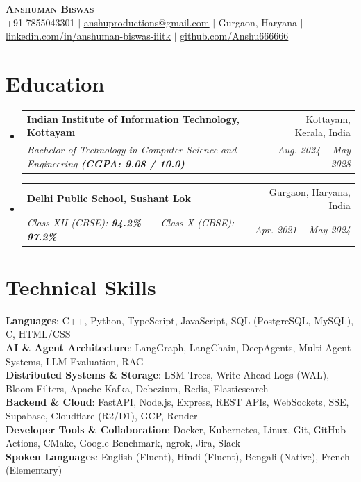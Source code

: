 \documentclass[letterpaper,10pt]{article}
\makeatletter
\newcommand{\resumeSubheading}[4]{
  \vspace{-3pt}\item
    \begin{tabular*}{0.98\textwidth}[t]{l@{\extracolsep{\fill}}r}
      \textbf{#1} & #2 \\
      \textit{\small#3} & \textit{\small #4} \\
    \end{tabular*}\vspace{-6pt}
}
\newcommand{\resumeSubHeadingListStart}{\begin{itemize}[leftmargin=0.15in, label={}]}
\newcommand{\resumeSubHeadingListEnd}{\end{itemize}}
\makeatother
\begin{document}
\begin{center}
    \textbf{\Huge \scshape Anshuman Biswas} \\ \vspace{2pt}
    \small +91 7855043301 $|$ 
    \href{mailto:anshuproductions@gmail.com}{\underline{anshuproductions@gmail.com}} $|$ 
    Gurgaon, Haryana $|$ 
    \href{https://www.linkedin.com/in/anshuman-biswas-iiitk/}{\underline{linkedin.com/in/anshuman-biswas-iiitk}} $|$
    \href{https://github.com/Anshu666666}{\underline{github.com/Anshu666666}}
\end{center}
\vspace{-14pt}

\section{Education}
  \resumeSubHeadingListStart
    \resumeSubheading
      {Indian Institute of Information Technology, Kottayam}{Kottayam, Kerala, India}
      {Bachelor of Technology in Computer Science and Engineering \textbf{(CGPA: 9.08 / 10.0)}}{Aug. 2024 -- May 2028}
    \resumeSubheading
      {Delhi Public School, Sushant Lok}{Gurgaon, Haryana, India}
      {Class XII (CBSE): \textbf{94.2\%} \ $|$ \ Class X (CBSE): \textbf{97.2\%}}{Apr. 2021 -- May 2024}
  \resumeSubHeadingListEnd

\section{Technical Skills}
 \begin{itemize}[leftmargin=0.15in, itemsep=0.5pt, parsep=0pt, label={}]
    \small{\item{
     \textbf{Languages}{: C++, Python, TypeScript, JavaScript, SQL (PostgreSQL, MySQL), C, HTML/CSS} \\
     \textbf{AI \& Agent Architecture}{: LangGraph, LangChain, DeepAgents, Multi-Agent Systems, LLM Evaluation, RAG} \\
     \textbf{Distributed Systems \& Storage}{: LSM Trees, Write-Ahead Logs (WAL), Bloom Filters, Apache Kafka, Debezium, Redis, Elasticsearch} \\
     \textbf{Backend \& Cloud}{: FastAPI, Node.js, Express, REST APIs, WebSockets, SSE, Supabase, Cloudflare (R2/D1), GCP, Render} \\
     \textbf{Developer Tools \& Collaboration}{: Docker, Kubernetes, Linux, Git, GitHub Actions, CMake, Google Benchmark, ngrok, Jira, Slack} \\
     \textbf{Spoken Languages}{: English (Fluent), Hindi (Fluent), Bengali (Native), French (Elementary)}
    }}
 \end{itemize}
 \vspace{-6pt}
\end{document}
